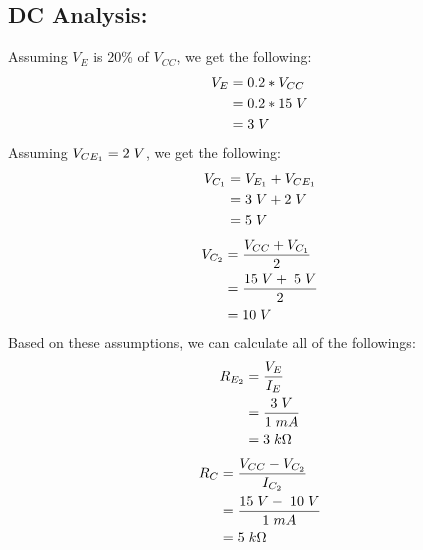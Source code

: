 \documentclass{article}
\begin{document}
	\subsection*{DC Analysis:}
	Assuming $V_{E}$ is 20\% of $V_{CC}$, we get the following:
	\begin{align*}
		V_{E} &= 0.2 * V_{CC}\\
				&= 0.2 * 15 \hspace{1mm} V\\
				&= 3 \hspace{1mm} V
	\end{align*}
	\noindent Assuming $V_{CE_{1}} = 2 \hspace{1mm} V$, we get the following:
	\begin{align*}
		V_{C_1} &= V_{E_1} + V_{CE_1}\\
		&= 3 \hspace{1mm} V + 2 \hspace{1mm} V\\
		&= 5 \hspace{1mm} V
	\end{align*}
	\begin{align*}
		V_{C_2} &= \frac{V_{CC} + V_{C_1}}{2}\\
		&= \frac{15 \hspace{1mm} V + \hspace{1mm} 5 \hspace{1mm} V}{2}\\
		&= 10 \hspace{1mm} V
	\end{align*}
	Based on these assumptions, we can calculate all of the followings:
	\begin{align*}
		R_{E_2} &= \frac{V_{E}}{I_{E}}\\
		&= \frac{3 \hspace{1mm} V}{1 \hspace{1mm} mA}\\ 
		&= 3 \hspace{1mm} k\Omega
	\end{align*}
	\begin{align*}
		R_C &= \frac{V_{CC} - V_{C_2}}{I_{C_2}}\\ 
		&= \frac{15 \hspace{1mm} V - \hspace{1mm} 10 \hspace{1mm} V}{1 \hspace{1mm} mA}\\ 
		&= 5 \hspace{1mm} k\Omega
	\end{align*}
\end{document}
